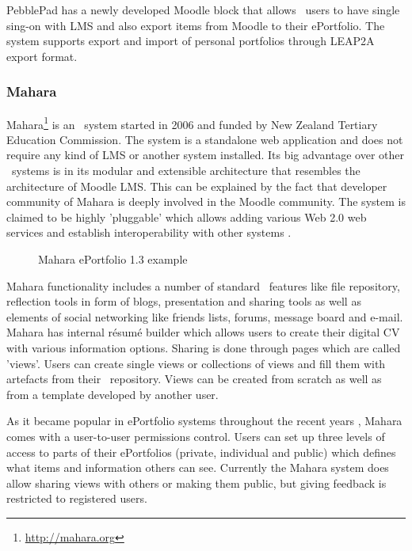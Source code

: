 PebblePad has a newly developed Moodle block that allows \ep~users to have
single sing-on with LMS and also export items from Moodle to their ePortfolio.
The system supports export and import of personal portfolios through LEAP2A
export format.
 
\subsubsection{Mahara}
Mahara\footnote{\url{http://mahara.org}} is an \ep~system started in 2006 and
funded by New Zealand Tertiary Education Commission. The system is a standalone
web application and does not require any kind of LMS or another system
installed. Its big advantage over other \ep~systems is in its modular and
extensible architecture that resembles the architecture of Moodle LMS. This can
be explained by the fact that developer community of Mahara is deeply involved
in the Moodle community. The system is claimed to be highly 'pluggable' which
allows adding various Web 2.0 web services and establish interoperability with
other systems \citep{MaharaGovernanceGroup2011}.

\begin{figure}[htb]
\centering
\setlength\fboxsep{0pt}
\setlength\fboxrule{0.5pt}
\caption{Mahara ePortfolio 1.3 example}
\label{fig:maharaep}
\end{figure}

Mahara functionality includes a number of standard \ep~features like file
repository, reflection tools in form of blogs, presentation and sharing tools as
well as elements of social networking like friends lists, forums, message board
and e-mail. Mahara has internal r\'{e}sum\'{e} builder which allows users to
create their digital CV with various information options. Sharing is done
through pages which are called 'views'. Users can create single views or
collections of views and fill them with artefacts from their \ep~repository.
Views can be created from scratch as well as from a template developed by
another user.

As it became popular in ePortfolio systems throughout the recent years
\citep{Waters2009}, Mahara comes with a user-to-user permissions control. Users
can set up three levels of access to parts of their ePortfolios (private,
individual and public) which defines what items and information others can see.
Currently the Mahara system does allow sharing views with others or making them
public, but giving feedback is restricted to registered users.

